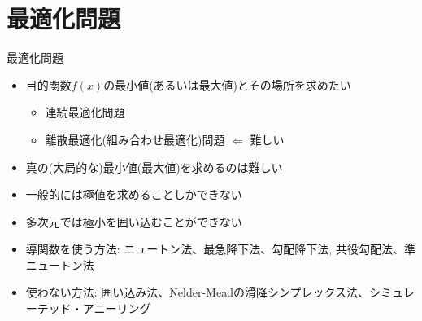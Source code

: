 \section{最適化問題}

\begin{frame}[t,fragile]{最適化問題}
  \begin{itemize}
  \item 目的関数$f(x)$の最小値(あるいは最大値)とその場所を求めたい
    \begin{itemize}
    \item 連続最適化問題
    \item 離散最適化(組み合わせ最適化)問題 $\Leftarrow$ 難しい
    \end{itemize}
  \item 真の(大局的な)最小値(最大値)を求めるのは難しい
  \item 一般的には極値を求めることしかできない
  \item 多次元では極小を囲い込むことができない
  \item 導関数を使う方法: ニュートン法、最急降下法、勾配降下法, 共役勾配法、準ニュートン法
  \item 使わない方法: 囲い込み法、Nelder-Meadの滑降シンプレックス法、シミュレーテッド・アニーリング
  \end{itemize}
\end{frame}
